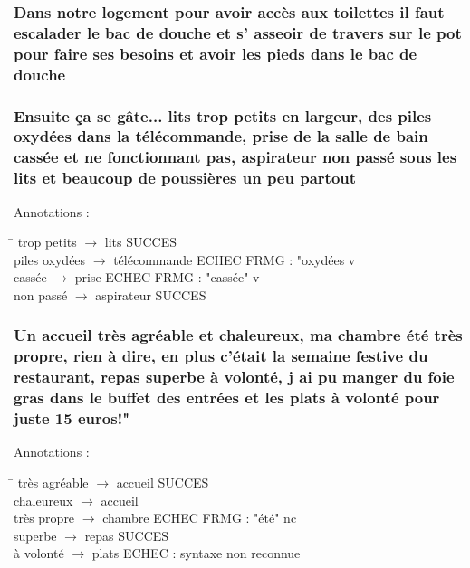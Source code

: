 \documentclass[smaller]{beamer}
\begin{document}
\begin{frame}
\frametitle{Dans notre logement pour avoir accès aux toilettes il faut escalader le bac de douche et s' asseoir de travers sur le pot pour faire ses besoins et avoir les pieds dans le bac de douche}
\end{frame}


\begin{frame}
\frametitle{Ensuite ça se gâte... lits trop petits en largeur, des piles oxydées dans la télécommande, prise de la salle de bain cassée et ne fonctionnant pas, aspirateur non passé sous les lits et beaucoup de poussières un peu partout}
\begin{block}{Annotations :}
\begin{tabbing}
\hspace{6cm}\=\kill
trop petits $\rightarrow$ lits             \> SUCCES\\
piles oxydées $\rightarrow$ télécommande   \> ECHEC FRMG : "oxydées v\\
cassée $\rightarrow$ prise                 \> ECHEC FRMG : "cassée" v\\
non passé $\rightarrow$ aspirateur         \> SUCCES
\end{tabbing}
\end{block}
\end{frame}


\begin{frame}
\frametitle{Un accueil très agréable et chaleureux, ma chambre été très propre, rien à dire, en plus c'était la semaine festive du restaurant, repas superbe à volonté, j ai pu manger du foie gras dans le buffet des entrées et les plats à volonté pour juste 15 euros!"}
\begin{block}{Annotations :}
\begin{tabbing}
\hspace{6cm}\=\kill
très agréable $\rightarrow$ accueil \> SUCCES\\
chaleureux $\rightarrow$ accueil\\
très propre $\rightarrow$ chambre   \> ECHEC FRMG : "été" nc\\
superbe $\rightarrow$ repas         \> SUCCES\\
à volonté $\rightarrow$ plats       \> ECHEC : syntaxe non reconnue
\end{tabbing}
\end{block}
\end{frame}
\end{document}

